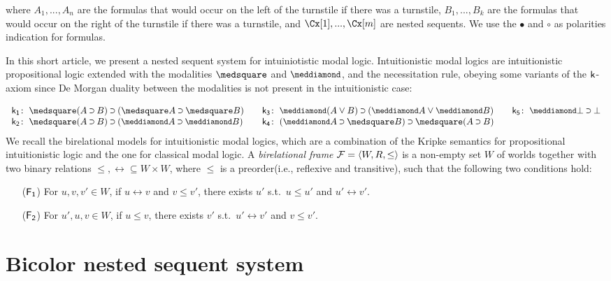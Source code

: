 \documentclass{easychair}
\begin{document}
where $A_{1}, . . . , A_{n}$ are the formulas that would occur on the left of the turnstile if there was a turnstile, $B_{1}, . . . , B_{k}$ are the formulas that would occur on the right of the turnstile if there was a turnstile, and $\Cx[1], . . . , \Cx[m]$ are nested sequents. We use the $\bullet$ and $\circ$ as polarities indication for formulas.

In this short article, we present a nested sequent system for intuiniotistic modal logic. Intuitionistic modal logics are intuitionistic propositional logic extended with the modalities $\BOX$ and $\DIA$, and the necessitation rule, obeying some variants of the $\mathsf{k_{}}$-axiom since De Morgan duality between the modalities is not present in the intuitionistic case:

\begin{equation*}
\label{eq:ik}%
\begin{array}[t]{r@{\;}l@{\qquad}r@{\;}l@{\qquad}r@{\;}l}
\kax[1]\colon&\BOX(A\IMP B)\IMP(\BOX A\IMP\BOX B)
&
\kax[3]\colon&\DIA(A\OR B)\IMP(\DIA A\OR\DIA B)
&
\kax[5]\colon&\DIA\BOT\IMP\BOT
\\
\kax[2]\colon&\BOX(A\IMP B)\IMP(\DIA A\IMP\DIA B)
&
\kax[4]\colon&(\DIA A\IMP \BOX B)\IMP\BOX(A\IMP B)\\%
\end{array}
\end{equation*}
We recall the birelational models \cite{plotkin1986, ewald1986} for intuitionistic modal logics, which are a combination of the Kripke semantics for propositional intuitionistic logic and the one for classical modal logic. A \emph{birelational frame} $\mathcal{F} = \langle W, R, \le \rangle$ is a non-empty set $W$ of worlds together with two binary relations $\le, \rel \subseteq W \times W$, where $\le$ is a preorder(i.e., reflexive and transitive), such that the following two conditions hold:

\begin{enumerate}
	\item[($\mathsf{F_1}$)] For $u, v, v' \in W$, if $u \rel v$ and $v \le v'$, there exists $u'$ s.t.~$u \le u'$ and $u' \rel v'$.
	
	\item[($\mathsf{F_2}$)] For $u', u, v \in W$, if $u \le v$, there exists $v'$ s.t.~$u' \rel v'$ and $v\le v'$.
\end{enumerate}

\section{Bicolor nested sequent system}
\end{document}
